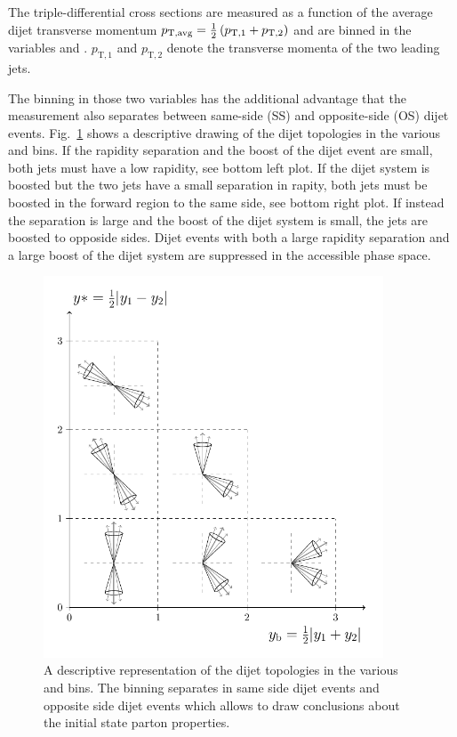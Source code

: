 The triple-differential cross sections are measured as a function of the average
dijet transverse momentum $p_{\mathrm{T,avg}} = \frac{1}{2}\left(p_{\mathrm{T},1} +
p_{\mathrm{T},2}\right)$ and are binned in the variables \ystar and \yboost.
$p_{\mathrm{T},1}$ and $p_{\mathrm{T},2}$ denote the transverse momenta of the
two leading jets. 

The binning in those two variables has the additional advantage that the
measurement also separates between same-side (SS) and opposite-side (OS) dijet
events. Fig.~\ref{fig:ysyb_schema} shows a descriptive drawing of the
dijet topologies in the various \ystar and \yboost bins. If the rapidity
separation and the boost of the dijet event are small, both jets must have a low
rapidity, see bottom left plot. If the dijet system is boosted but the two jets
have a small separation in rapity, both jets must be boosted in the forward region to
the same side, see bottom right plot. If instead the separation is large and the
boost of the dijet system is small, the jets are boosted to opposide
sides. Dijet events with both a large rapidity separation and a large boost of
the dijet system are suppressed in the accessible phase space.

\begin{figure}[htbp]
    \centering
    \includegraphics[width=0.9\textwidth]{figures/measurement/ybys.pdf}
    \caption[Dijet topologies in \ystar and \yboost phasespace]
        {A descriptive representation of the dijet topologies in the various
    \ystar and \yboost bins. The binning separates in same side dijet
    events and opposite side dijet events which allows to draw conclusions about
    the initial state parton properties.}
    \label{fig:ysyb_schema}
\end{figure}

